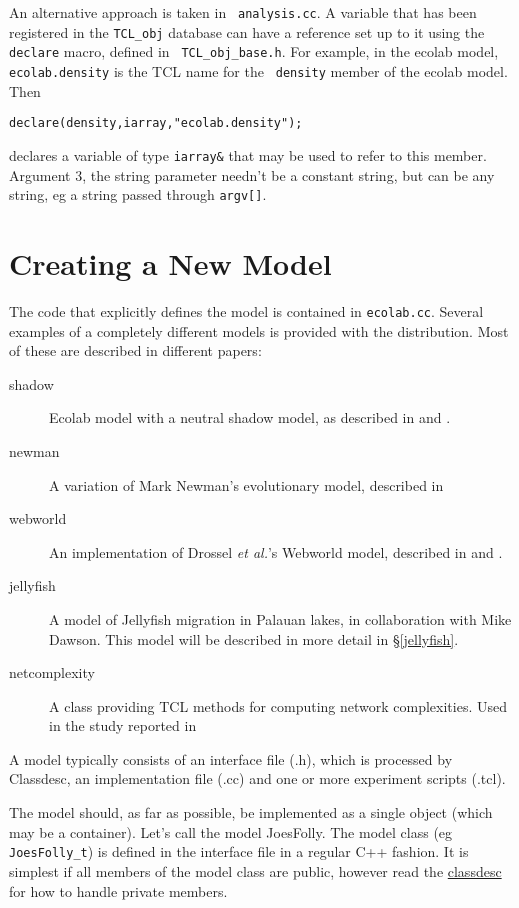 An alternative approach is taken in {\tt
  analysis.cc}. A variable that has been registered
  in the {\tt TCL\_obj} database can have a reference set up to it
  using the {\tt declare} macro, defined in {\tt
  TCL\_obj\_base.h}. For example, in the
  ecolab model, {\tt ecolab.density} is the TCL name for the {\tt
  density} member of the ecolab model. Then
\begin{verbatim}
declare(density,iarray,"ecolab.density");
\end{verbatim}
declares a variable of type \verb+iarray&+ that may be used to refer to
this member. Argument 3, the string parameter needn't be a constant
string, but can be any string, eg a string passed through {\tt argv[]}.

\section{Creating a New Model}\label{new model}

The code that explicitly defines the \EcoLab{} model is contained in
{\tt ecolab.cc}. Several examples of a completely different models is
provided with the \EcoLab{} distribution. Most of these are described
in different papers:
\begin{description}
\item[shadow] Ecolab model with a neutral shadow model, as described in
  \cite{Standish00c} and \cite{Standish02b}.
\item[newman] A variation of Mark Newman's evolutionary model,
  described in \cite{Standish98a}
\item[webworld] An implementation of Drossel {\em et al.}'s Webworld
  model, described in \cite{Drossel-etal01} and \cite{Standish04a}.
\item[jellyfish] A model of Jellyfish migration in Palauan lakes, in
  collaboration with Mike Dawson. This model will be described in more
  detail in \S\ref{jellyfish}.
\item[netcomplexity] A class providing TCL methods for computing
  network complexities. Used in the study reported in \cite{Standish05a}
\end{description}

A model typically consists of an interface file (.h), which is
processed by Classdesc, an implementation file (.cc) and one or more
experiment scripts (.tcl).

The model should, as far as possible, be implemented as a single
object (which may be a container). Let's call the model JoesFolly. The
model class (eg \verb+JoesFolly_t+) is defined in the interface file in a
regular C++ fashion. It is simplest if all members of the model class
are public, however read the \hyperref{Classdesc chapter}{Classdesc
  chapter (\S}{)}{classdesc} for how to handle
private members.

